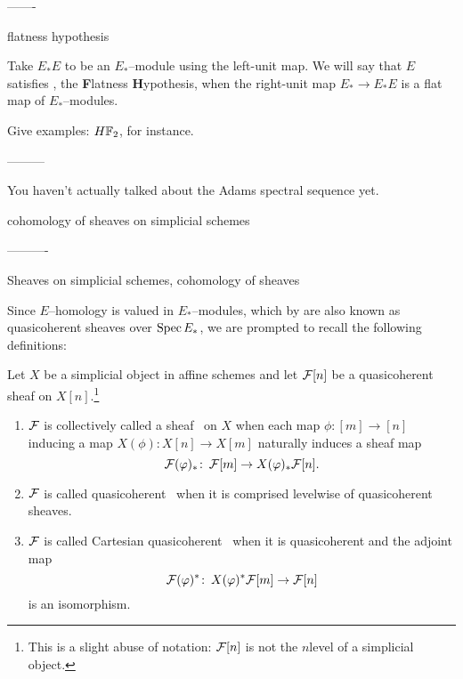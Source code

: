 -------

flatness hypothesis

\begin{definition}
Take $E_* E$ to be an $E_*$--module using the left-unit map.  We will say that $E$ satisfies \FH, the \textbf Flatness \textbf Hypothesis, when the right-unit map $E_* \to E_* E$ is a flat map of $E_*$--modules.
\end{definition}

Give examples: $H\mathbb F_2$, for instance.



---------

You haven't actually talked about the Adams spectral sequence yet.

cohomology of sheaves on simplicial schemes


----------




Sheaves on simplicial schemes, cohomology of sheaves

Since $E$--homology is valued in $E_*$--modules, which by  are also known as quasicoherent sheaves over $\operatorname{Spec} E_*$, we are prompted to recall the following definitions:
\begin{definition}
Let $X$ be a simplicial object in affine schemes and let $\mathcal{F}[n]$ be a quasicoherent sheaf on $X[n]$.\footnote{This is a slight abuse of notation: $\mathcal{F}[n]$ is not the $n$\th level of a simplicial object.}
\begin{enumerate}
\item $\mathcal{F}$ is collectively called a sheaf~\cite[Tag 09VK]{stacks-project} on $X$ when each map $\phi: [m] \to [n]$ inducing a map $X(\phi): X[n] \to X[m]$ naturally induces a sheaf map \[\mathcal{F}(\varphi)_* \colon\thinspace \mathcal{F}[m] \to X(\varphi)_* \mathcal{F}[n].\]
\item $\mathcal{F}$ is called quasicoherent~\cite[Tag 07TF]{stacks-project} when it is comprised levelwise of quasicoherent sheaves.
\item $\mathcal{F}$ is called Cartesian quasicoherent~\cite[Tag 07TF]{stacks-project} when it is quasicoherent and the adjoint map \[\mathcal{F}(\varphi)^* \colon\thinspace X(\varphi)^* \mathcal{F}[m] \to \mathcal{F}[n]\] is an isomorphism.
\end{enumerate}
\end{definition}



